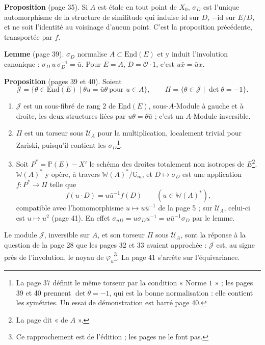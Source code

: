 \documentclass[11pt,a4paper]{article}
\begin{document}
\textbf{Proposition} (page 35). Si $A$ est étale en tout point de $X_0$, $\sigma_D$ est
l'unique automorphisme de la structure de similitude qui induise $\mathrm{id}$ sur
$D$, $-\mathrm{id}$ sur $E/D$, et ne soit l'identité au voisinage d'aucun point.
C'est la proposition précédente, transportée par $f$.

\textbf{Lemme} (page 39). $\sigma_D$ normalise $A \subset \underline{\mathrm{End}}(E)$ et y
induit l'involution canonique : $\sigma_D\,u\,\sigma_D^{-1} = \bar{u}$. Pour $E = A$,
$D = \mathcal{O}\cdot 1$, c'est $\overline{u\bar{x}} = \bar{u}x$.

\textbf{Proposition} (pages 39 et 40). Soient
\[
  \mathcal{J} = \{\theta \in \underline{\mathrm{End}}(E) \mid \theta u = \bar{u}\theta \ \text{pour } u \in A\}, \qquad
  \Pi = \{\theta \in \mathcal{J} \mid \det\theta = -1\}.
\]
\begin{enumerate}
\item[a)] $\mathcal{J}$ est un sous-fibré de rang $2$ de $\underline{\mathrm{End}}(E)$,
sous-$A$-Module à gauche et à droite, les deux structures liées par $u\theta =
\theta\bar{u}$ ; c'est un $A$-Module inversible.
\item[b)] $\Pi$ est un torseur sous $\mathcal{U}_A$ pour la multiplication, localement
trivial pour Zariski, puisqu'il contient les $\sigma_D$\footnote{La page 37 définit
le même torseur par la condition « Norme $1$ » ; les pages 39 et 40 prennent
$\det\theta = -1$, qui est la bonne normalisation : elle contient les symétries.
Un essai de démonstration est barré page 40.}.
\item[c)] Soit $P^{*} = \mathbb{P}(E) - X'$ le schéma des droites totalement non
isotropes de $E$\footnote{La page dit « de $A$ ».}. $\mathbb{W}(A)^{*}$ y opère, à
travers $\mathbb{W}(A)^{*}/\mathbb{G}_m$, et $D \mapsto \sigma_D$ est une application
$f : P^{*} \to \Pi$ telle que
\[
  f(u\cdot D) = u\bar{u}^{-1} f(D) \qquad (u \in \mathbb{W}(A)^{*}),
\]
compatible avec l'homomorphisme $u \mapsto u\bar{u}^{-1}$ de la page 5 ; sur
$\mathcal{U}_A$, celui-ci est $u \mapsto u^{2}$ (page 41). En effet $\sigma_{uD} =
u\sigma_Du^{-1} = u\bar{u}^{-1}\sigma_D$ par le lemme.
\end{enumerate}
Le module $\mathcal{J}$, inversible sur $A$, et son torseur $\Pi$ sous $\mathcal{U}_A$,
sont la réponse à la question de la page 28 que les pages 32 et 33 avaient
approchée : $\mathcal{J}$ est, au signe près de l'involution, le noyau de
$\varphi_u$\footnote{Ce rapprochement est de l'édition ; les pages ne le font
pas.}. La page 41 s'arrête sur l'équivariance.
\end{document}
